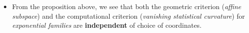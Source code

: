 \documentclass[11pt]{article}
\begin{document}
\begin{itemize}
\item From the proposition above, we see that both the  geometric criterion (\emph{affine subspace}) and the computational criterion (\emph{vanishing statistical curvature}) for \emph{exponential families} are \textbf{independent} of choice of coordinates. 
\end{itemize}


\newpage


\end{document}
